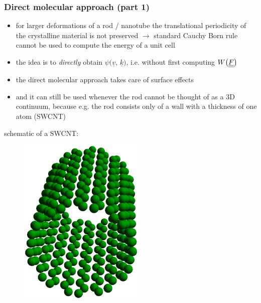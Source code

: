 \begin{frame}
  \frametitle{Direct molecular approach (part 1)}
  
  \begin{itemize}
    \item for larger deformations of a rod / nanotube the translational periodicity of the crystalline material is not preserved \newline
      $\rightarrow$ standard Cauchy Born rule cannot be used to compute the energy of a unit cell
    \item the idea is to \textit{directly} obtain $\psi \bigl( \underline{v}, \, \underline{k} \bigr)$, i.e. without first computing $W \bigl( \underline{\underline{F}} \bigr)$
    \item the direct molecular approach takes care of surface effects
    \item and it can still be used whenever the rod cannot be thought of as a 3D continuum, \newline because e.g. the rod consists only of a wall with a thickness of one atom (SWCNT)
  \end{itemize}
  
  \vspace{0.5em}
  schematic of a SWCNT:
  
  \vspace{-2em}
  \begin{figure}
      \centering
      \includegraphics[width=6cm, keepaspectratio=true]{sections/cosserat_rods/images/SWCNT}
  \end{figure}
  
  
\end{frame}


